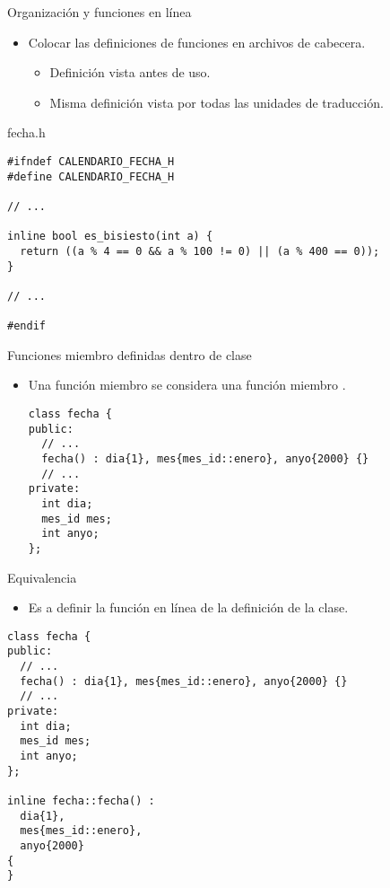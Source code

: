 \begin{frame}[t,fragile]{Organización y funciones en línea}
\begin{itemize}
  \item Colocar las definiciones de funciones  en archivos de cabecera.
    \begin{itemize}
      \item Definición vista antes de uso.
      \item Misma definición vista por todas las unidades de traducción.
    \end{itemize}
\end{itemize}
\begin{block}{fecha.h}
\begin{lstlisting}
#ifndef CALENDARIO_FECHA_H
#define CALENDARIO_FECHA_H

// ...

inline bool es_bisiesto(int a) {
  return ((a % 4 == 0 && a % 100 != 0) || (a % 400 == 0));
}

// ...

#endif
\end{lstlisting}
\end{block}
\end{frame}

\begin{frame}[t,fragile]{Funciones miembro definidas dentro de clase}
\begin{itemize}
  \item Una función miembro  se considera 
        una función miembro .
\begin{lstlisting}
class fecha {
public:
  // ...
  fecha() : dia{1}, mes{mes_id::enero}, anyo{2000} {}
  // ...
private:
  int dia;
  mes_id mes;
  int anyo;
};
\end{lstlisting}
\end{itemize}
\end{frame}

\begin{frame}[t,fragile]{Equivalencia}
\begin{itemize}
  \item Es  a definir la función en línea 
         de la definición de la clase.
\end{itemize}
\begin{lstlisting}
class fecha {
public:
  // ...
  fecha() : dia{1}, mes{mes_id::enero}, anyo{2000} {}
  // ...
private:
  int dia;
  mes_id mes;
  int anyo;
};

inline fecha::fecha() :
  dia{1},
  mes{mes_id::enero},
  anyo{2000}
{
}
\end{lstlisting}
\end{frame}

